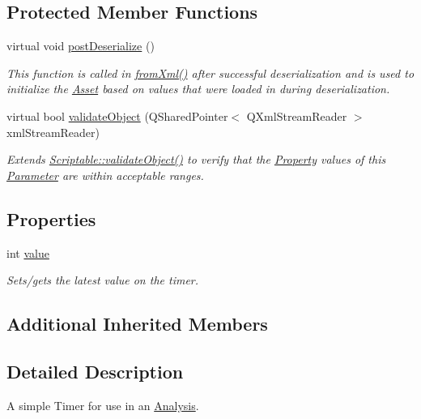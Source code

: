 \subsection*{Protected Member Functions}
\begin{DoxyCompactItemize}
\item 
virtual void \hyperlink{class_picto_1_1_analysis_timer_af97de4c2bfcfb47209eafdc5d1e0c6ab}{post\-Deserialize} ()
\begin{DoxyCompactList}\small\item\em This function is called in \hyperlink{class_picto_1_1_asset_a8bed4da09ecb1c07ce0dab313a9aba67}{from\-Xml()} after successful deserialization and is used to initialize the \hyperlink{class_picto_1_1_asset}{Asset} based on values that were loaded in during deserialization. \end{DoxyCompactList}\item 
virtual bool \hyperlink{class_picto_1_1_analysis_timer_ac3e36dbc727da6f3aa6304b4d1878e3d}{validate\-Object} (Q\-Shared\-Pointer$<$ Q\-Xml\-Stream\-Reader $>$ xml\-Stream\-Reader)
\begin{DoxyCompactList}\small\item\em Extends \hyperlink{class_picto_1_1_scriptable_ab6e2944c43a3b5d418bf7b251594386d}{Scriptable\-::validate\-Object()} to verify that the \hyperlink{class_picto_1_1_property}{Property} values of this \hyperlink{class_picto_1_1_parameter}{Parameter} are within acceptable ranges. \end{DoxyCompactList}\end{DoxyCompactItemize}
\subsection*{Properties}
\begin{DoxyCompactItemize}
\item 
int \hyperlink{class_picto_1_1_analysis_timer_a306d79a087eb6fe3e89de8abbc0b45c8}{value}
\begin{DoxyCompactList}\small\item\em Sets/gets the latest value on the timer. \end{DoxyCompactList}\end{DoxyCompactItemize}
\subsection*{Additional Inherited Members}


\subsection{Detailed Description}
A simple Timer for use in an \hyperlink{class_picto_1_1_analysis}{Analysis}. 

